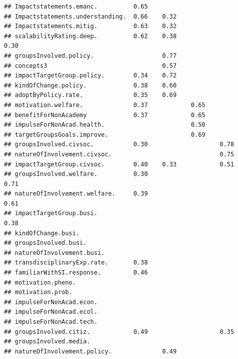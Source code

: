 \documentclass[
]{article}
\begin{document}
\begin{verbatim}
## Impactstatements.emanc.          0.65                                          
## Impactstatements.understanding.  0.66    0.32                                  
## Impactstatements.mitig.          0.63    0.32                                  
## scalabilityRating.deep.          0.62    0.38                            0.30  
## groupsInvolved.policy.                   0.77                                  
## concepts3                                0.57                                  
## impactTargetGroup.policy.        0.34    0.72                                  
## kindOfChange.policy.             0.38    0.60                                  
## adoptByPolicy.rate.              0.35    0.69                                  
## motivation.welfare.              0.37            0.65                          
## benefitForNonAcademy             0.37            0.65                          
## impulseForNonAcad.health.                        0.50                          
## targetGroupsGoals.improve.                       0.69                          
## groupsInvolved.civsoc.           0.30                    0.78                  
## natureOfInvolvement.civsoc.                              0.75                  
## impactTargetGroup.civsoc.        0.40    0.33            0.51                  
## groupsInvolved.welfare.          0.30                            0.71          
## natureOfInvolvement.welfare.     0.39                            0.61          
## impactTargetGroup.busi.                                                  0.38  
## kindOfChange.busi.                                                             
## groupsInvolved.busi.                                                           
## natureOfInvolvement.busi.                                                      
## transdisciplinaryExp.rate.       0.38                                          
## familiarWithSI.response.         0.46                                          
## motivation.pheno.                                                              
## motivation.prob.                                                               
## impulseForNonAcad.econ.                                                        
## impulseForNonAcad.ecol.                                                        
## impulseForNonAcad.tech.                                                        
## groupsInvolved.citiz.            0.49                    0.35                  
## groupsInvolved.media.                                                          
## natureOfInvolvement.policy.              0.49                                  

\end{verbatim}
\end{document}
